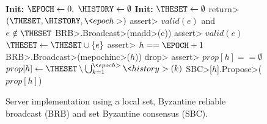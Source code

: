 \begin{figure}[t!]
	\begin{algorithm}[H]
          \caption{\small Server implementation using a local set,
            Byzantine reliable broadcast (BRB) and set Byzantine
            consensus (SBC).
            }~\label{DPO-alg-basb3}
          \small
		\begin{algorithmic}[1]
			\State  \textbf{Init:} $\EPOCH \leftarrow 0,$
			\hspace{2em} $\HISTORY \leftarrow \emptyset$
			\State  \textbf{Init:} $\THESET \leftarrow \emptyset$\label{alg3:theset}
			        \State \<return> $(\THESET, \HISTORY,\<epoch>)$\label{alg3:get}
			\EndFunction
                                \State \<assert> $valid(e)$ and $e \notin \THESET$
                                \State \<BRB>.\<Broadcast>(\<madd>(e)) \label{alg3:brb-broadcast}
                                \EndFunction
                                \State \<assert> $valid(e)$
			        \State $\THESET \leftarrow \THESET \cup \{e\}$ \label{add_theset_BRBDeliver}
			\EndUpon
                                \State \<assert> $h==\EPOCH +1$
			        \State \<BRB>.\<Broadcast>(\<mepochinc>($h$))
                        \EndFunction
                                \State \<drop>
                        \EndUpon
                                \State \<assert> \(prop[h] == \emptyset\)
                                \State $prop[h] \leftarrow \THESET \setminus 
                                \bigcup_{k=1}^{\<epoch>} \<history>(k)$
                                \State \<SBC>[$h$].\<Propose>($prop[h]$)
			\EndUpon

\end{algorithmic}
\end{algorithm}
\end{figure}

